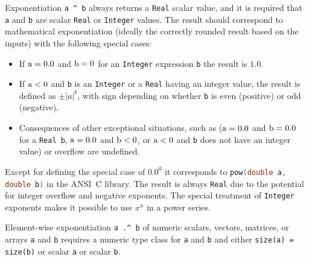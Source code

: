 Exponentiation \lstinline!a ^ b! always returns a \lstinline!Real! scalar value, and it is required that \lstinline!a! and \lstinline!b! are scalar \lstinline!Real! or \lstinline!Integer! values.
The result should correspond to mathematical exponentiation (ideally the correctly rounded result based on the inputs) with the following special cases:
\begin{itemize}
\item If $\text{\lstinline!a!} = 0.0$ and $\text{\lstinline!b!} = 0$ for an \lstinline!Integer! expression \lstinline!b! the result is $1.0$.
\item If $\text{\lstinline!a!} < 0$ and \lstinline!b! is an \lstinline!Integer! or a \lstinline!Real! having an integer value, the result is defined as $\pm |a|^b$, with sign depending on whether \lstinline!b! is even (positive) or odd (negative).
\item Consequences of other exceptional situations, such as ($\text{\lstinline!a!} = 0.0$ and $\text{\lstinline!b!} = 0.0$ for a \lstinline!Real b!, $\text{\lstinline!a!} = 0.0$ and $\text{\lstinline!b!} < 0$, or $\text{\lstinline!a!} < 0$ and \lstinline!b! does not have an integer value) or overflow are undefined.
\end{itemize}

\begin{nonnormative}
Except for defining the special case of $0.0^0$ it corresponds to \lstinline[language=C]!pow(double a, double b)! in the ANSI~C library.
The result is always \lstinline!Real! due to the potential for integer overflow and negative exponents.
The special treatment of \lstinline!Integer! exponents makes it possible to use $x^n$ in a power series.
\end{nonnormative}

Element-wise exponentiation \lstinline!a .^ b! of numeric scalars, vectors, matrices, or arrays \lstinline!a! and \lstinline!b! requires a numeric type class for
\lstinline!a! and \lstinline!b! and either \lstinline!size(a) = size(b)! or scalar \lstinline!a! or scalar \lstinline!b!.

